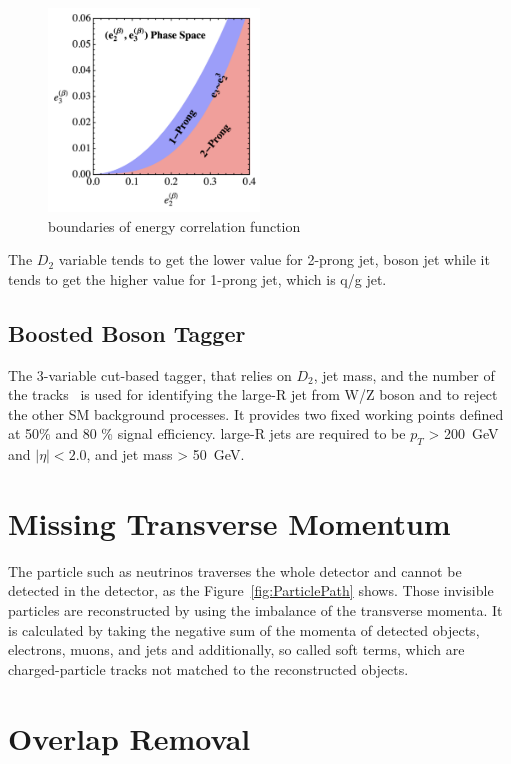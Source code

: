 \begin{figure}[tbp]
    \begin{center}
    \includegraphics[width=0.50\textwidth,keepaspectratio]{figures/Reconstruction/phasespace23}
    \caption{
    boundaries of energy correlation function \cite{Larkoski_2014}
    }
    \label{fig:phasespace23}
    \end{center}
\end{figure}
The $D_2$ variable tends to get the lower value for 2-prong jet, boson jet while it tends to get the higher value for 1-prong jet, which is q/g jet.
\subsection{Boosted Boson Tagger}
The 3-variable cut-based tagger, that relies on $D_2$, jet mass, and the number of the tracks~\cite{ATL-PHYS-PUB-2020-017} is used for identifying the large-R jet from W/Z boson and to reject the other SM background processes. It provides two fixed working points defined at 50\% and 80 \% signal efficiency. 
large-R jets are required to be $p_T$ > 200~GeV and $|\eta| <2.0$, and jet mass > 50~GeV.
\section{Missing Transverse Momentum}
The particle such as neutrinos traverses the whole detector and cannot be detected in the detector, as the Figure~\ref{fig:ParticlePath} shows. Those invisible particles are reconstructed by using the imbalance of the transverse momenta. It is calculated by taking the negative sum of the momenta of detected objects, electrons, muons, and jets and additionally, so called soft terms, which are charged-particle tracks not matched to the reconstructed objects\cite{PERF-2016-07}.
\section{Overlap Removal}


